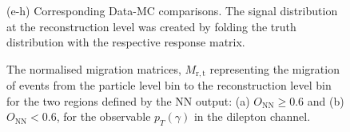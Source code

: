 \begin{figure}[!ht]
  \quad\quad
  \caption[]{(e-h) Corresponding Data-MC comparisons. The signal distribution at the reconstruction level was created by folding the truth distribution with the respective response matrix.}
  \label{fig:folding_input_response_ljet_pt2}
\end{figure}

\begin{figure}[ht]
    \centering
    \quad\quad

    \caption{The normalised migration matrices, $M_{\mathrm{r,t}}$ representing the migration of events from the particle level bin to the reconstruction level bin for the two regions defined by the NN output: (a) $O_{\mathrm{NN}} \geq 0.6$ 
    and (b) $O_{\mathrm{NN}} < 0.6$, for the observable $p_T(\gamma)$ in the dilepton channel.}
    \label{fig:folding_input_migration_dilep}
\end{figure}
\FloatBarrier

